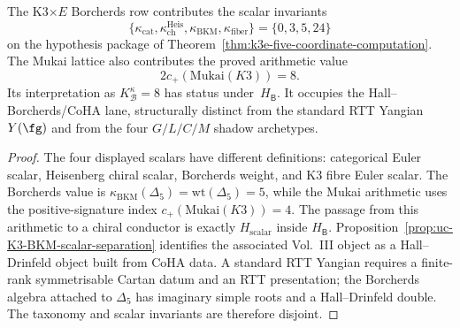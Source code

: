 \begin{proposition}
\label{prop:landscape-k3-bkm-taxonomy}
The K3$\times E$ Borcherds row contributes the scalar invariants
\[
\{\kappa_{\mathrm{cat}},\kappa_{\mathrm{ch}}^{\mathrm{Heis}},
\kappa_{\mathrm{BKM}},\kappa_{\mathrm{fiber}}\}
=\{0,3,5,24\}
\]
on the hypothesis package of
Theorem~\ref{thm:k3e-five-coordinate-computation}.  The Mukai lattice
also contributes the proved arithmetic value
\[
2c_+(\mathrm{Mukai}(K3))=8.
\]
Its interpretation as $K^\kappa_{\mathcal B}=8$ has status
\ClaimStatusConjectured under~$H_{\mathsf B}$.
It occupies the Hall--Borcherds/CoHA lane, structurally distinct from
the standard RTT Yangian $Y(\fg)$ and from the four $G/L/C/M$ shadow
archetypes.
\end{proposition}

\begin{proof}
The four displayed scalars have different definitions: categorical
Euler scalar, Heisenberg chiral scalar, Borcherds weight, and K3 fibre
Euler scalar. The Borcherds value is
$\kappa_{\mathrm{BKM}}(\Delta_5)=\mathrm{wt}(\Delta_5)=5$, while the
Mukai arithmetic uses the positive-signature index
$c_+(\mathrm{Mukai}(K3))=4$.  The passage from this arithmetic to a
chiral conductor is exactly $H_{\mathrm{scalar}}$ inside
$H_{\mathsf B}$. Proposition~\ref{prop:uc-K3-BKM-scalar-separation}
identifies the associated Vol.~III object as a Hall--Drinfeld object
built from CoHA data. A standard RTT Yangian requires a finite-rank
symmetrisable Cartan datum and an RTT presentation; the Borcherds
algebra attached to $\Delta_5$ has imaginary simple roots and a
Hall--Drinfeld double. The taxonomy and scalar invariants are therefore
disjoint.
\end{proof}

